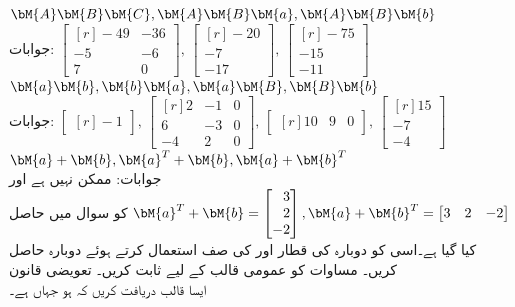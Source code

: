 \quad
$\bM{A}\bM{B}\bM{C}, \bM{A}\bM{B}\bM{a}, \bM{A}\bM{B}\bM{b}$\\
جوابات:
$\begin{bmatrix*}[r] -49&-36\\-5&-6\\7&0  \end{bmatrix*}, \, \begin{bmatrix*}[r] -20\\-7\\-17 \end{bmatrix*},\, \begin{bmatrix*}[r] -75\\-15\\-11 \end{bmatrix*}$
\quad
$\bM{a}\bM{b}, \bM{b}\bM{a}, \bM{a}\bM{B},\bM{B}\bM{b}$\\
جوابات:
$\begin{bmatrix*}[r] -1\end{bmatrix*}, \,\begin{bmatrix*}[r]2&-1&0\\6&-3&0\\-4&2&0  \end{bmatrix*},\,\begin{bmatrix*}[r]10&9&0  \end{bmatrix*},\, \begin{bmatrix*}[r]15\\-7\\-4 \end{bmatrix*}$ \\
\quad
$\bM{a}+\bM{b}, \bM{a}^T+\bM{b}, \bM{a}+\bM{b}^T$\\
جوابات: ممکن نہیں ہے اور
$\bM{a}^T+\bM{b}=\begin{bmatrix*}[r] 3\\2\\-2 \end{bmatrix*}, \bM{a}+\bM{b}^T=\begin{bmatrix*}[r]3&2&-2  \end{bmatrix*}$ 
 کو سوال  میں حاصل کیا گیا ہے۔اسی کو دوبارہ  کی  قطار اور  کی صف استعمال کرتے ہوئے دوبارہ حاصل کریں۔
مساوات  کو عمومی  قالب کے لیے ثابت کریں۔
\quad تعویضی قانون\\
ایسا  قالب  دریافت کریں کہ  ہو جہاں
  ہے۔

